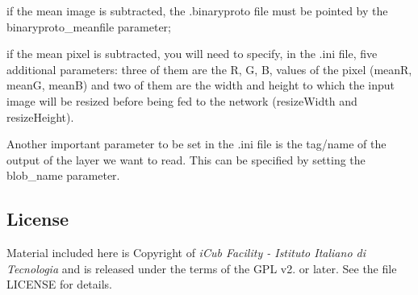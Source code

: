 \begin{DoxyItemize}
\item if the mean image is subtracted, the {\ttfamily .binaryproto} file must be pointed by the {\ttfamily binaryproto\+\_\+meanfile} parameter;
\item if the mean pixel is subtracted, you will need to specify, in the {\ttfamily .ini} file, five additional parameters\+: three of them are the R, G, B, values of the pixel ({\ttfamily meanR}, {\ttfamily meanG}, {\ttfamily meanB}) and two of them are the width and height to which the input image will be resized before being fed to the network ({\ttfamily resize\+Width} and {\ttfamily resize\+Height}).
\end{DoxyItemize}

Another important parameter to be set in the {\ttfamily .ini} file is the tag/name of the output of the layer we want to read. This can be specified by setting the {\ttfamily blob\+\_\+name} parameter.

\subsection*{License}

Material included here is Copyright of {\itshape i\+Cub Facility -\/ Istituto Italiano di Tecnologia} and is released under the terms of the G\+PL v2. or later. See the file L\+I\+C\+E\+N\+SE for details. 